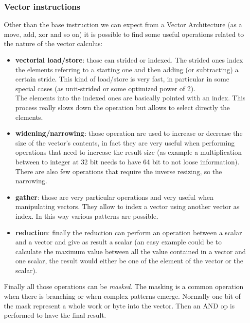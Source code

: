 \subsubsection{Vector instructions}
Other than the base instruction we can expect from a Vector Architecture (as a move, add, xor and so on) it is possible to find some useful operations related to the nature of the vector calculus\cite{riscv-v-specs}:
\begin{itemize}
    \item \textbf{vectorial load/store}: those can strided or indexed. The strided ones index the elements referring to a starting one and then adding (or subtracting) a certain stride. This kind of load/store is very fast, in particular in some special cases (as unit-strided or some optimized power of 2).\\
    The elements into the indexed ones are basically pointed with an index. This process really slows down the operation but allows to select directly the elements.
    
    \item \textbf{widening/narrowing}: those operation are used to increase or decrease the size of the vector's contents, in fact they are very useful when performing operations that need to increase the result size (as example a multiplication between to integer at 32 bit needs to have 64 bit to not loose information). There are also few operations that require the inverse resizing, so the narrowing.
    
    \item \textbf{gather}: those are very particular operations and very useful when manipulating vectors. They allow to index a vector using another vector as index. In this way various patterns are possible.
    
    \item \textbf{reduction}: finally the reduction can perform an operation between a scalar and a vector and give as result a scalar (an easy example could be to calculate the maximum value between all the value contained in a vector and one scalar, the result would either be one of the element of the vector or the scalar).
    
\end{itemize}


Finally all those operations can be \textit{masked}. The masking is a common operation when there is branching or when complex patterns emerge.
Normally one bit of the mask represent a whole work or byte into the vector. Then an AND op is performed to have the final result. 

